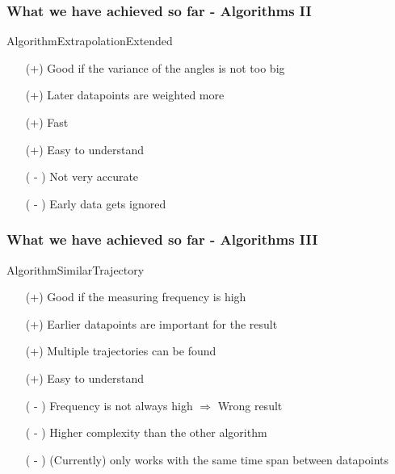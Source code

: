 \documentclass[xcolor=dvipsnames]{beamer}
\begin{document}
\begin{frame}
	\frametitle{What we have achieved so far - Algorithms II}
	\Large{AlgorithmExtrapolationExtended}
	\normalsize{}
			\begin{itemize}
				\item[(+)] Good if the variance of the angles is not too big
				\item[(+)] Later datapoints are weighted more
				\item[(+)] Fast
				\item[(+)] Easy to understand
				\item[] 
				\item[( - )] Not very accurate
				\item[( - )] Early data gets ignored

			\end{itemize}
\end{frame}

\begin{frame}
	\frametitle{What we have achieved so far - Algorithms III}
	\Large{AlgorithmSimilarTrajectory}
	\normalsize{}
			\begin{itemize}
				\item[(+)] Good if the measuring frequency is high
				\item[(+)] Earlier datapoints are important for the result
				\item[(+)] Multiple trajectories can be found
				\item[(+)] Easy to understand
				\item[] 
				\item[( - )] Frequency is not always high $\Rightarrow$ Wrong result
				\item[( - )] Higher complexity than the other algorithm
				\item[( - )] (Currently) only works with the same time span between datapoints
			\end{itemize}
\end{frame}
\end{document}

